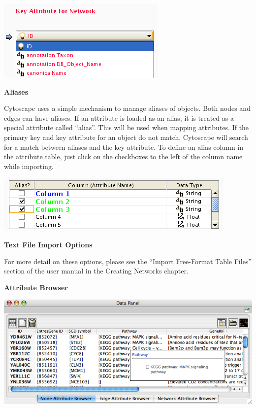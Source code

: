 \includegraphics[width=\textwidth]{images/attribute_table_import_keyattr.png} 


 
\textbf{Aliases}


 Cytoscape uses a simple mechanism to manage aliases of objects. Both nodes and edges can have aliases. If an attribute is loaded as an alias, it is treated as a special attribute called ``alias''. This will be used when mapping attributes. If the primary key and key attribute for an object do not match, Cytoscape will search for a match between aliases and the key attribute. To define an alias column in the attribute table, just click on the checkboxes to the left of the column name while importing. 


 \includegraphics[width=\textwidth]{images/attribute_table_import_alias.png} 


 
\textbf{Text File Import Options}


 For more detail on these options, please see the ``Import Free-Format Table Files'' section of the user manual in the Creating Networks chapter. 


 

\textbf{Attribute Browser}


 \includegraphics[width=\textwidth]{images/attribute_browser26.png} 


